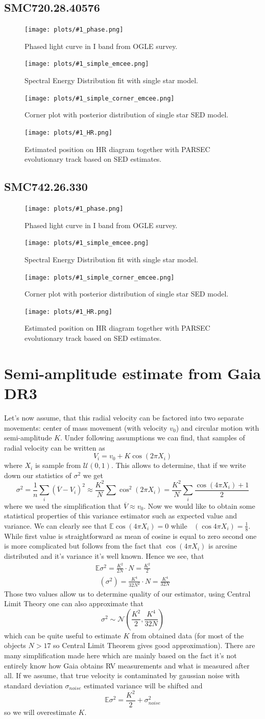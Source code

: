 \documentclass{pracalicmgr}
\DeclareMathOperator{\Var}{\widehat{Var}}
\newcommand{\summary}[1]{
    \begin{figure}[H]
        \begin{center}
        \texttt{[image: plots/\#1\_phase.png]}
        \caption{Phased light curve in I band from OGLE survey.}
        \end{center}
    \end{figure}
    \begin{figure}[H]
          \centering
          \texttt{[image: plots/\#1\_simple\_emcee.png]}
    \caption{Spectral Energy Distribution fit with single star model.}
    \end{figure}%
    \begin{figure}[H]
          \centering
          \texttt{[image: plots/\#1\_simple\_corner\_emcee.png]}
          \caption{Corner plot with posterior distribution of single star SED model.}
    \end{figure}
    \begin{figure}[H]
        \centering
        \texttt{[image: plots/\#1\_HR.png]}
        \caption{Estimated position on HR diagram together with PARSEC evolutionary track based on SED estimates.}
  \end{figure}
}
\begin{document}
\begin{appendices}
    \section{SMC720.28.40576}
    \summary{SMC720.28.40576}
    \section{SMC742.26.330}
    \summary{SMC742.26.330}

    \chapter{Semi-amplitude estimate from Gaia DR3}
    Let's now assume, that this radial velocity can be factored into two separate movements: center of mass movement (with velocity $v_0$) and circular motion with semi-amplitude $K$. Under following 
assumptions we can find, that samples of radial velocity can be written as 
\begin{equation}
    V_i=v_0+K\cos{(2\pi X_i)}
\end{equation}
where $X_i$ is sample from $\mathcal{U}(0,1)$. This allows to determine, that if we write down our statistics of $\sigma^2$ we get 
\begin{equation}
    \sigma^2=\frac{1}{n}\sum_i (\overline{V}-V_i)^2\approx \frac{K^2}{N}\sum \cos^2{(2\pi X_i)}=\frac{K^2}{N}\sum_i \frac{\cos{(4\pi X_i)}+1}{2}
\end{equation}
where we used the simplification that $\overline{V}\approx v_0$. Now we would like to obtain some statistical properties of this variance estimator such as expected value and variance.
We can clearly see that $\mathbb{E}\cos{(4\pi X_i)}=0$ while $\Var(\cos{4\pi X_i})=\frac{1}{8}$. While first value is straightforward as mean of cosine is equal to zero second one 
is more complicated but follows from the fact that $\cos{(4\pi X_i)}$ is arcsine distributed and it's variance it's well known. Hence we see, that 
\begin{align}\label{semi}
    \mathbb{E} \sigma^2 = \frac{K^2}{2N}\cdot N = \frac{K^2}{2}\\ 
    \Var (\sigma^2) = \frac{K^4}{32N^2}\cdot N = \frac{K^4}{32N}
\end{align} 
Those two values allow us to determine quality of our estimator, using Central Limit Theory one can also approximate that 
\begin{equation}
    \sigma^2 \sim \mathcal{N}\left(\frac{K^2}{2},\frac{K^4}{32N}\right)
\end{equation}
which can be quite useful to estimate $K$ from obtained data (for most of the objects $N>17$ so Central Limit Theorem gives good approximation).
There are many simplification made here which are mainly based on the fact it's not entirely know how Gaia obtains RV measurements and what is measured after all.
If we assume, that true velocity is contaminated by gaussian noise with standard deviation $\sigma_{noise}$ estimated variance will be shifted and 
\begin{equation}
    \mathbb{E} \sigma^2 = \frac{K^2}{2}+\sigma_{noise}^2
\end{equation} 
so we will overestimate $K$.
    \end{appendices}
\end{document}
